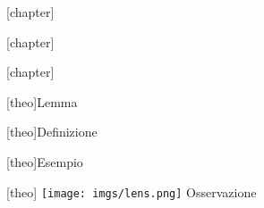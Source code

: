 \theoremstyle{break}
\theoremheaderfont{\normalfont\bfseries}
\theorembodyfont{\itshape}
\theoremsymbol{\ensuremath{\diamondsuit}}
\theoremseparator{\newline}
\newtheorem{theo}{\texttt{[image: imgs/book.png]}Teorema}[chapter]

\theoremstyle{break}
\theoremheaderfont{\normalfont\bfseries}
\theorembodyfont{\itshape}
\theoremsymbol{\ensuremath{\diamondsuit}}
\theoremseparator{\newline}
[chapter]

\theoremstyle{break}
\theoremheaderfont{\normalfont\bfseries}
\theorembodyfont{\itshape}
\theoremsymbol{\ensuremath{\diamondsuit}}
\theoremseparator{\newline}
[chapter]

\theoremstyle{break}
\theoremheaderfont{\normalfont\bfseries}
\theorembodyfont{\itshape}
\theoremsymbol{\ensuremath{\diamondsuit}}
\theoremseparator{\newline}
[chapter]

\theoremstyle{break}
\theoremheaderfont{\normalfont\bfseries}
\theorembodyfont{\itshape}
\theoremsymbol{\ensuremath{\diamondsuit}}
\theoremseparator{\newline}
[theo]{Lemma}

\theoremstyle{break}
\theoremsymbol{\ensuremath{\clubsuit}}
\theoremseparator{\newline}
[theo]{Definizione}

\theoremstyle{break}
\theorembodyfont{\itshape}
\theoremsymbol{\ensuremath{\ast}}
\theoremseparator{\newline}
[theo]{Esempio}

\theoremstyle{break}
\theorembodyfont{\itshape}
\theoremsymbol{\ensuremath{\ast}}
\theoremseparator{\newline}
[theo]{
\texttt{[image: imgs/lens.png]}
Osservazione
}

\newtheorem*{notaz}{Notazione}

\newenvironment{thproof}
{
\vskip 0.03cm
\begin{small}
\textit{Dimostrazione. }
\color{code}
}
{
\color{black}
\end{small}
$ \square $
\vskip 0.2cm
}

